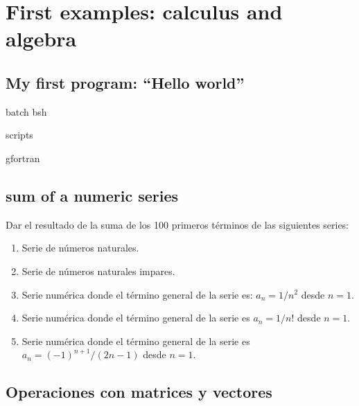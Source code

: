     \chapter{First examples: calculus and algebra  \label{primeros_programas} }
   
   
   \section{My first program: ``Hello world''  \label{hello_world} }
   
   
   batch bsh 
   
   scripts 
   
   
   gfortran 
   
   
   
   
   \section{sum of a numeric series  \label{numeric_series} }
   
   Dar el resultado de la suma de los 100 primeros términos de las siguientes series: 
   \begin{enumerate}    
    \item Serie de números naturales.
    \item Serie de números naturales impares.
    \item Serie numérica donde el término general de la serie es: $ a_n = 1/n^2 $ desde $ n= 1 $.  
    \item Serie numérica donde el término general de la serie es $ a_n = 1/ n! $ desde $ n=1$.  %
    \item Serie numérica donde el término general de la serie es
    $ a_n = (-1)^{n+1}/ (2n-1) $ desde $ n=1$.   
   \end{enumerate}         
   
   
   
   
   
   
   \section{Operaciones con matrices y vectores   \label{vectores_matrices} }
   
